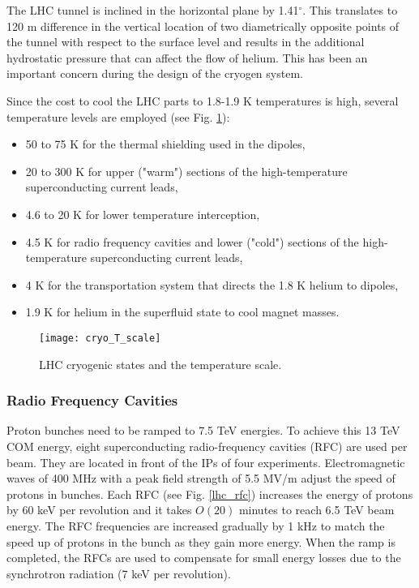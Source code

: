 The LHC tunnel is inclined in the horizontal plane by 1.41$^\circ$. This translates to 120 m difference in the vertical location of two diametrically opposite points of the tunnel with respect to the surface level and results in the additional hydrostatic pressure that can affect the flow of helium. This has been an important concern during the design of the cryogen system.


Since the cost to cool the LHC parts to 1.8-1.9 K temperatures is high, several temperature levels are employed (see Fig. \ref{cryo_T_scale}):
 
\begin{itemize}
\item 50 to 75 K for the thermal shielding used in the dipoles,
\item 20 to 300 K for upper ("warm") sections of the high-temperature superconducting current leads,
\item 4.6 to 20 K for lower temperature interception,
\item 4.5 K for radio frequency cavities and lower ("cold") sections of the high-temperature superconducting current leads,
\item 4 K for the transportation system that directs the 1.8 K helium to dipoles,
\item 1.9 K for helium in the superfluid state to cool magnet masses.
\end{itemize}

\begin{figure}[H]
  \centering
  \texttt{[image: cryo\_T\_scale]}
  \caption{LHC cryogenic states and the temperature scale.}\label{cryo_T_scale}
  \label{cryo_T_scale}
\end{figure}




\subsubsection{Radio Frequency Cavities}\label{sec:rf}


Proton bunches need to be ramped to 7.5 TeV energies. To achieve this 13 TeV COM energy, eight superconducting radio-frequency cavities (RFC) are used per beam. They are located in front of the IPs of four experiments. Electromagnetic waves of 400 MHz with a peak field strength of 5.5 MV/m adjust the speed of protons in bunches. Each RFC (see Fig. \ref{lhc_rfc}) increases the energy of protons by 60 keV per revolution and it takes $O(20)$ minutes to reach 6.5 TeV beam energy. The RFC frequencies are increased gradually by 1 kHz to match the speed up of protons in the bunch as they gain more energy. When the ramp is completed, the RFCs are used to compensate for small energy losses due to the synchrotron radiation (7 keV per revolution). 




